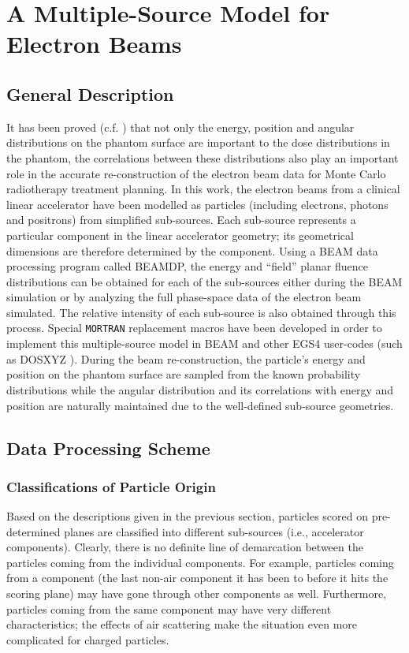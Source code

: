 \documentclass[12pt,twoside]{article}
\begin{document}
\section{A Multiple-Source Model for Electron Beams}

\subsection{General Description}

It has been proved (c.f. \cite{Ma96}) that not only the energy, position
and angular distributions on the phantom surface are important to the dose
distributions in the phantom, the correlations between these distributions
also play an important role in the accurate re-construction of the
electron beam data for Monte Carlo radiotherapy treatment planning. In
this work, the electron beams from a clinical linear accelerator have been
modelled as particles (including electrons, photons and positrons) from
simplified sub-sources. Each sub-source represents a particular component
in the linear accelerator geometry; its geometrical dimensions are
therefore determined by the component. Using a BEAM data processing
program called BEAMDP\cite{MR95a}, the energy and ``field'' planar fluence
distributions can be obtained for each of the sub-sources either during
the BEAM simulation or by analyzing the full phase-space data of the
electron beam simulated. The relative intensity of each sub-source is also
obtained through this process. Special {\tt MORTRAN} replacement macros have
been developed in order to implement this multiple-source model in BEAM
and other EGS4 user-codes (such as DOSXYZ \cite{Ma95b}). During the beam
re-construction, the particle's energy and position on the phantom surface
are sampled from the known probability distributions while the angular
distribution and its correlations with energy and position are naturally
maintained due to the well-defined sub-source geometries.

\subsection{Data Processing Scheme}

\subsubsection{Classifications of Particle Origin}

Based on the descriptions given in the previous section, particles scored
on pre-determined planes are classified into different sub-sources (i.e.,
accelerator components). Clearly, there is no definite line of demarcation
between the particles coming from the individual components. For example,
particles coming from a component (the last non-air component it has been
to before it hits the scoring plane) may have gone through other
components as well. Furthermore, particles coming from the same component
may have very different characteristics; the effects of air scattering
make the situation even more complicated for charged particles.
\end{document}
